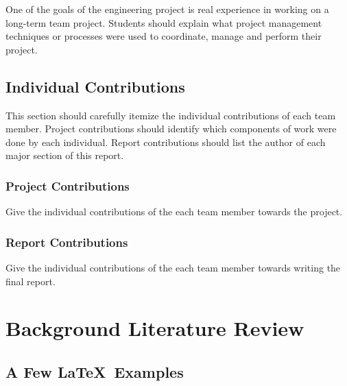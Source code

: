 \documentclass[12pt]{report}
\begin{document}
One of the goals of the engineering project is real experience in working on a long-term team project.  Students should explain what project management techniques or processes were used to coordinate, manage and perform their project.


\section{Individual Contributions}

This section should carefully itemize the individual contributions of each team member. Project contributions should identify which components of work were done by each individual.  Report contributions should list the author of each major section of this report.


\subsection{Project Contributions}

Give the individual contributions of the each team member towards the project.


\subsection{Report Contributions}

Give the individual contributions of the each team member towards writing the
final report.


\chapter{Background Literature Review}


\section{A Few \LaTeX\ Examples}
\end{document}
